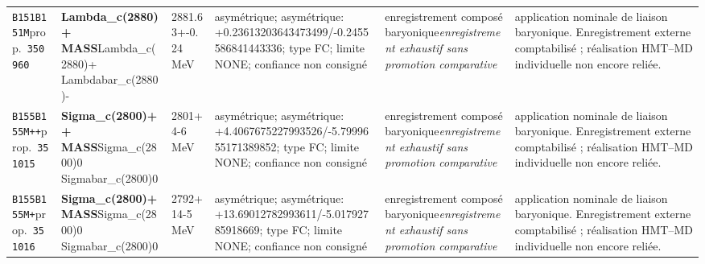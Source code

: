 \begin{landscape}
\begin{longtable}{L{1.85cm}L{4.45cm}L{2.35cm}L{4.05cm}L{3.35cm}L{7.15cm}}
\texttt{B151}\newline \texttt{B151M}\newline prop.\ \texttt{350960} & \textbf{Lambda\_\allowbreak{}c(2880)+ MASS}\newline Lambda\_\allowbreak{}c(2880)+ \textbar{}\allowbreak{} Lambdabar\_\allowbreak{}c(2880)- & 2881.63+-0.24\,MeV & asymétrique; asymétrique: +0.23613203643473499/-0.2455586841443336; type FC; limite NONE; confiance non consigné & enregistrement composé baryonique\newline \emph{enregistrement exhaustif sans promotion comparative} & application nominale de liaison baryonique. Enregistrement externe comptabilisé ; réalisation HMT--MD individuelle non encore reliée. \\
\texttt{B155}\newline \texttt{B155M++}\newline prop.\ \texttt{351015} & \textbf{Sigma\_\allowbreak{}c(2800)++ MASS}\newline Sigma\_\allowbreak{}c(2800)0 \textbar{}\allowbreak{} Sigmabar\_\allowbreak{}c(2800)0 & 2801+4-6\,MeV & asymétrique; asymétrique: +4.4067675227993526/-5.7999655171389852; type FC; limite NONE; confiance non consigné & enregistrement composé baryonique\newline \emph{enregistrement exhaustif sans promotion comparative} & application nominale de liaison baryonique. Enregistrement externe comptabilisé ; réalisation HMT--MD individuelle non encore reliée. \\
\texttt{B155}\newline \texttt{B155M+}\newline prop.\ \texttt{351016} & \textbf{Sigma\_\allowbreak{}c(2800)+ MASS}\newline Sigma\_\allowbreak{}c(2800)0 \textbar{}\allowbreak{} Sigmabar\_\allowbreak{}c(2800)0 & 2792+14-5\,MeV & asymétrique; asymétrique: +13.69012782993611/-5.01792785918669; type FC; limite NONE; confiance non consigné & enregistrement composé baryonique\newline \emph{enregistrement exhaustif sans promotion comparative} & application nominale de liaison baryonique. Enregistrement externe comptabilisé ; réalisation HMT--MD individuelle non encore reliée. \\

\end{longtable}
\end{landscape}

